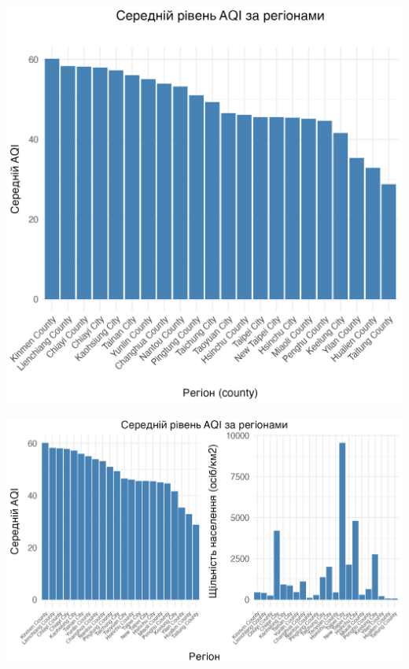 \documentclass[./report.tex]{subfiles}
\begin{document}
\begin{enumerate}
  \includegraphics[width=\linewidth]{plots/question4/avg_aqi_by_county.png}

  \includegraphics[width=\linewidth]{plots/question4/avg_aqi_by_county_w_dens.png}


\end{enumerate}
\end{document}

